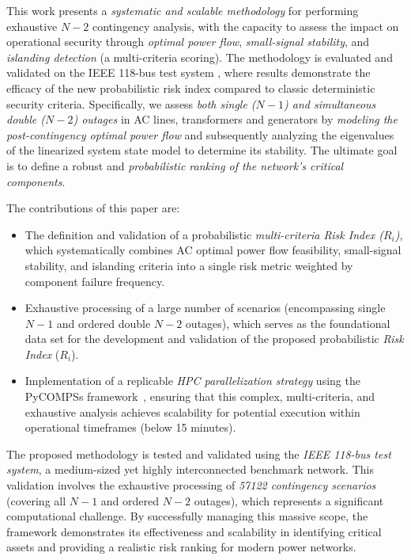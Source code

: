 \documentclass[journal]{IEEEtran}
\begin{document}
This work presents a \textit{systematic and scalable methodology} for performing exhaustive $N-2$ contingency analysis, with the capacity to assess the impact on operational security through \textit{optimal power flow}, \textit{small-signal stability}, and \textit{islanding detection} (a multi-criteria scoring). The methodology is evaluated and validated on the IEEE 118-bus test system \cite{pena2017extended}, where results demonstrate the efficacy of the new probabilistic risk index compared to classic deterministic security criteria.
Specifically, we assess \textit{both single ($N-1$) and simultaneous double ($N-2$) outages} in AC lines, transformers and generators by \textit{modeling the post-contingency optimal power flow} and subsequently analyzing the eigenvalues of the linearized system state model to determine its stability. The ultimate goal is to define a robust and \textit{probabilistic ranking of the network's critical components}.

The contributions of this paper are:

\begin{itemize}
\item The definition and validation of a probabilistic \textit{multi-criteria Risk Index ($R_i$)}, which systematically combines AC optimal power flow feasibility, small-signal stability, and islanding criteria into a single risk metric weighted by component failure frequency.
\item Exhaustive processing of a large number of scenarios (encompassing single $N-1$ and ordered double $N-2$ outages), which serves as the foundational data set for the development and validation of the proposed probabilistic \textit{Risk Index} ($R_i$).
\item Implementation of a replicable \textit{HPC parallelization strategy} using the PyCOMPSs framework~\cite{pycompss_softx, pycompss_tejedor2017}, ensuring that this complex, multi-criteria, and exhaustive analysis achieves scalability for potential execution within operational timeframes (below 15 minutes).
\end{itemize}

\par
The proposed methodology is tested and validated using the \textit{IEEE 118-bus test system}, a medium-sized yet highly interconnected benchmark network. This validation involves the exhaustive processing of \textit{\num{57122} contingency scenarios} (covering all $N-1$ and ordered $N-2$ outages), which represents a significant computational challenge. By successfully managing this massive scope, the framework demonstrates its effectiveness and scalability in identifying critical assets and providing a realistic risk ranking for modern power networks.
\end{document}
